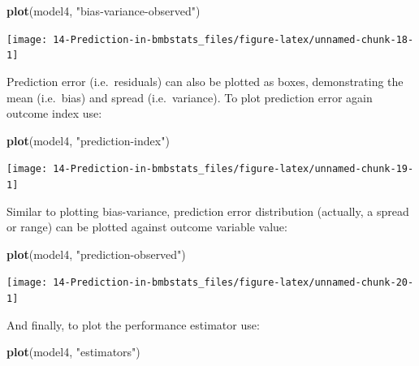 \documentclass[
]{book}
\newenvironment{Shaded}{\begin{snugshade}}{\end{snugshade}}
\newcommand{\KeywordTok}[1]{\textcolor[rgb]{0.13,0.29,0.53}{\textbf{#1}}}
\newcommand{\NormalTok}[1]{#1}
\newcommand{\StringTok}[1]{\textcolor[rgb]{0.31,0.60,0.02}{#1}}
\begin{document}
\begin{Shaded}
\begin{Highlighting}[]
\KeywordTok{plot}\NormalTok{(model4, }\StringTok{"bias{-}variance{-}observed"}\NormalTok{)}
\end{Highlighting}
\end{Shaded}

\begin{center}\texttt{[image: 14-Prediction-in-bmbstats\_files/figure-latex/unnamed-chunk-18-1]} \end{center}

Prediction error (i.e.~residuals) can also be plotted as boxes, demonstrating the mean (i.e.~bias) and spread (i.e.~variance). To plot prediction error again outcome index use:

\begin{Shaded}
\begin{Highlighting}[]
\KeywordTok{plot}\NormalTok{(model4, }\StringTok{"prediction{-}index"}\NormalTok{)}
\end{Highlighting}
\end{Shaded}

\begin{center}\texttt{[image: 14-Prediction-in-bmbstats\_files/figure-latex/unnamed-chunk-19-1]} \end{center}

Similar to plotting bias-variance, prediction error distribution (actually, a spread or range) can be plotted against outcome variable value:

\begin{Shaded}
\begin{Highlighting}[]
\KeywordTok{plot}\NormalTok{(model4, }\StringTok{"prediction{-}observed"}\NormalTok{)}
\end{Highlighting}
\end{Shaded}

\begin{center}\texttt{[image: 14-Prediction-in-bmbstats\_files/figure-latex/unnamed-chunk-20-1]} \end{center}

And finally, to plot the performance estimator use:

\begin{Shaded}
\begin{Highlighting}[]
\KeywordTok{plot}\NormalTok{(model4, }\StringTok{"estimators"}\NormalTok{)}
\end{Highlighting}
\end{Shaded}
\end{document}
